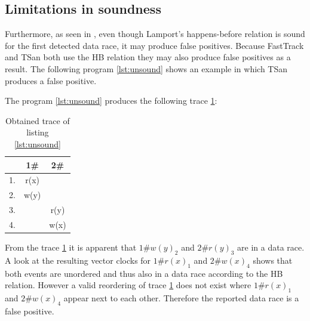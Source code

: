 \documentclass[12pt]{article}
\begin{document}
	\subsection{Limitations in soundness}
	Furthermore, as seen in \cite[p. 2]{marthur}, even though Lamport's happens-before relation is sound for the first detected data race, it may produce false positives. Because FastTrack and TSan both use the HB relation they may also produce false positives as a result. The following program \ref{lst:unsound} shows an example in which TSan produces a false positive.
	
	The program \ref{lst:unsound} produces the following trace \ref{trace3}:
	\begin{table}[H]
		\begin{center}
			\begin{tabular}{ c c c}
				& 1\# & 2\# \\
				\hline
				1. & r(x) & \\
				2. & w(y) & \\
				3. & & r(y) \\
				4. & & w(x) \\
			\end{tabular}
			\caption{Obtained trace of listing \ref{lst:unsound}}
			\label{trace3}
		\end{center}
	\end{table}
	From the trace \ref{trace3} it is apparent that $1\#w(y)_2$ and $2\#r(y)_3$ are in a data race. A look at the resulting vector clocks for $1\#r(x)_1$ and $2\#w(x)_4$ shows that both events are unordered and thus also in a data race according to the HB relation. However a valid reordering of trace \ref{trace3} does not exist where $1\#r(x)_1$ and $2\#w(x)_4$ appear next to each other. Therefore the reported data race is a false positive.
\end{document}
